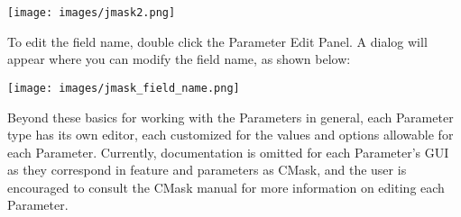 \texttt{[image: images/jmask2.png]}

To edit the field name, double click the Parameter Edit Panel. A dialog
will appear where you can modify the field name, as shown below:

\texttt{[image: images/jmask\_field\_name.png]}

Beyond these basics for working with the Parameters in general, each
Parameter type has its own editor, each customized for the values and
options allowable for each Parameter. Currently, documentation is
omitted for each Parameter's GUI as they correspond in feature and
parameters as CMask, and the user is encouraged to consult the CMask
manual for more information on editing each Parameter.
